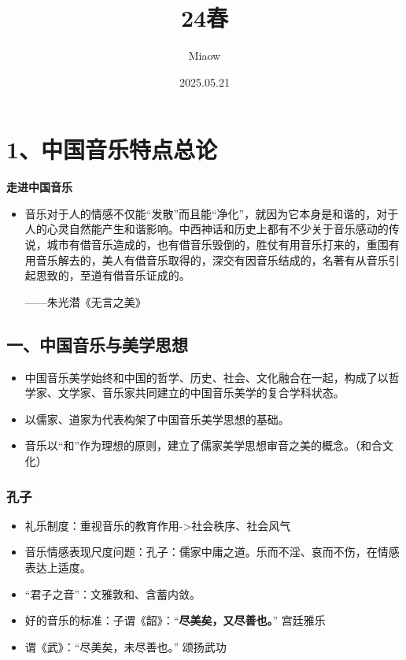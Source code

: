 \documentclass[
]{article}
\providecommand{\tightlist}{%
  \setlength{\itemsep}{0pt}\setlength{\parskip}{0pt}}
\begin{document}
\title{24春}
\author{Miaow}
\date{2025.05.21}

\pagestyle{headings}
\maketitle
\tableofcontents
\newpage

\section{1、中国音乐特点总论}\label{ux4e2dux56fdux97f3ux4e50ux7279ux70b9ux603bux8bba}

\textbf{走进中国音乐}

\begin{itemize}
\item
  音乐对于人的情感不仅能``发散''而且能``净化''，就因为它本身是和谐的，对于人的心灵自然能产生和谐影响。中西神话和历史上都有不少关于音乐感动的传说，城市有借音乐造成的，也有借音乐毁倒的，胜仗有用音乐打来的，重围有用音乐解去的，美人有借音乐取得的，深交有因音乐结成的，名著有从音乐引起思致的，至道有借音乐证成的。

  ------朱光潜《无言之美》
\end{itemize}

\subsection{一、中国音乐与美学思想}\label{ux4e00ux4e2dux56fdux97f3ux4e50ux4e0eux7f8eux5b66ux601dux60f3}

\begin{itemize}
\tightlist
\item
  中国音乐美学始终和中国的哲学、历史、社会、文化融合在一起，构成了以哲学家、文学家、音乐家共同建立的中国音乐美学的复合学科状态。
\item
  以儒家、道家为代表构架了中国音乐美学思想的基础。
\item
  音乐以``和''作为理想的原则，建立了儒家美学思想审音之美的概念。（和合文化）
\end{itemize}

\subsubsection{孔子}\label{ux5b54ux5b50}

\begin{itemize}
\tightlist
\item
  礼乐制度：重视音乐的教育作用-\textgreater 社会秩序、社会风气
\item
  音乐情感表现尺度问题：孔子：儒家中庸之道。乐而不淫、哀而不伤，在情感表达上适度。
\item
  ``君子之音''：文雅敦和、含蓄内敛。
\item
  好的音乐的标准：子谓《韶》：``\textbf{尽美矣，又尽善也。}'' 宫廷雅乐
\item
  谓《武》：``尽美矣，未尽善也。'' 颂扬武功
\end{itemize}
\end{document}
